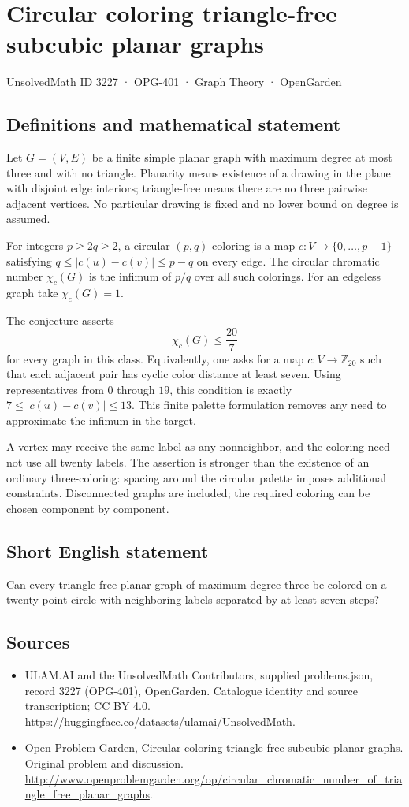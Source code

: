 \documentclass[11pt,a4paper]{article}
\begin{document}
\section*{Circular coloring triangle-free subcubic planar graphs}\label{3227}
{\small UnsolvedMath ID 3227 · OPG-401 · Graph Theory · OpenGarden}
\subsection{Definitions and mathematical statement}
Let $G=(V,E)$ be a finite simple planar graph with maximum degree at most three and with no triangle. Planarity means existence of a drawing in the plane with disjoint edge interiors; triangle-free means there are no three pairwise adjacent vertices. No particular drawing is fixed and no lower bound on degree is assumed.

For integers $p\ge2q\ge2$, a circular $(p,q)$-coloring is a map $c:V\to\{0,\ldots,p-1\}$ satisfying $q\le|c(u)-c(v)|\le p-q$ on every edge. The circular chromatic number $\chi_c(G)$ is the infimum of $p/q$ over all such colorings. For an edgeless graph take $\chi_c(G)=1$.

The conjecture asserts
\[
                        \chi_c(G)\le\frac{20}{7}
\]
for every graph in this class. Equivalently, one asks for a map $c:V\to\mathbb Z_{20}$ such that each adjacent pair has cyclic color distance at least seven. Using representatives from $0$ through $19$, this condition is exactly $7\le|c(u)-c(v)|\le13$. This finite palette formulation removes any need to approximate the infimum in the target.

A vertex may receive the same label as any nonneighbor, and the coloring need not use all twenty labels. The assertion is stronger than the existence of an ordinary three-coloring: spacing around the circular palette imposes additional constraints. Disconnected graphs are included; the required coloring can be chosen component by component.
\subsection{Short English statement}
Can every triangle-free planar graph of maximum degree three be colored on a twenty-point circle with neighboring labels separated by at least seven steps?
\subsection{Sources}
\begin{itemize}
\item[S1] ULAM.AI and the UnsolvedMath Contributors, supplied problems.json, record 3227 (OPG-401), OpenGarden. Catalogue identity and source transcription; CC BY 4.0.
\url{https://huggingface.co/datasets/ulamai/UnsolvedMath}.
\item[S2] Open Problem Garden, Circular coloring triangle-free subcubic planar graphs. Original problem and discussion.
\url{http://www.openproblemgarden.org/op/circular_chromatic_number_of_triangle_free_planar_graphs}.
\end{itemize}
\end{document}
